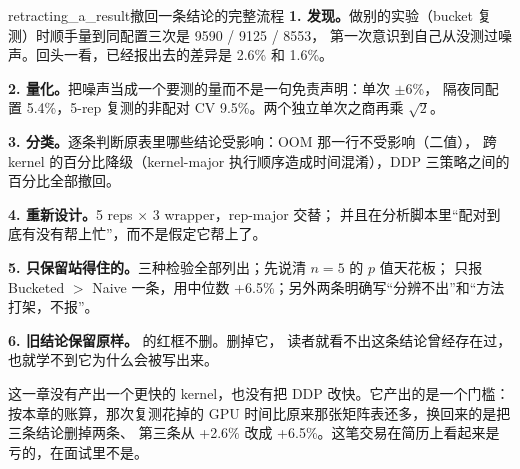 \begin{examplebox}{retracting_a_result}{撤回一条结论的完整流程}
\textbf{1. 发现。}做别的实验（bucket 复测）时顺手量到同配置三次是 9590 / 9125 / 8553，
第一次意识到自己从没测过噪声。回头一看，已经报出去的差异是 2.6\% 和 1.6\%。

\textbf{2. 量化。}把噪声当成一个要测的量而不是一句免责声明：单次 $\pm$6\%，
隔夜同配置 5.4\%，5-rep 复测的非配对 CV 9.5\%。两个独立单次之商再乘 $\sqrt{2}$。

\textbf{3. 分类。}逐条判断原表里哪些结论受影响：OOM 那一行不受影响（二值），
跨 kernel 的百分比降级（kernel-major 执行顺序造成时间混淆），DDP 三策略之间的百分比全部撤回。

\textbf{4. 重新设计。}5 reps $\times$ 3 wrapper，rep-major 交替；
并且在分析脚本里“配对到底有没有帮上忙”，而不是假定它帮上了。

\textbf{5. 只保留站得住的。}三种检验全部列出；先说清 $n=5$ 的 $p$ 值天花板；
只报 Bucketed $>$ Naive 一条，用中位数 +6.5\%；另外两条明确写“分辨不出”和“方法打架，不报”。

\textbf{6. 旧结论保留原样。} 的红框不删。删掉它，
读者就看不出这条结论曾经存在过，也就学不到它为什么会被写出来。
\end{examplebox}

这一章没有产出一个更快的 kernel，也没有把 DDP 改快。它产出的是一个门槛：
按本章的账算，那次复测花掉的 GPU 时间比原来那张矩阵表还多，换回来的是把三条结论删掉两条、
第三条从 +2.6\% 改成 +6.5\%。这笔交易在简历上看起来是亏的，在面试里不是。
